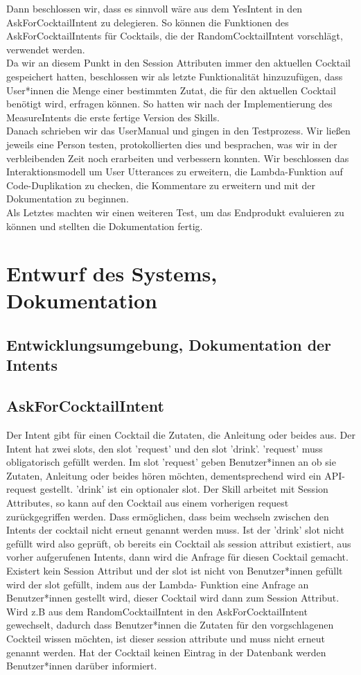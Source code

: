 \documentclass[12pt,letterpaper]{article}
\begin{document}
Dann beschlossen wir, dass es sinnvoll wäre aus dem YesIntent in den AskForCocktailIntent zu delegieren. So können die Funktionen des AskForCocktailIntents für Cocktails, die der RandomCocktailIntent vorschlägt, verwendet werden. \\ 
Da wir an diesem Punkt in den Session Attributen immer den aktuellen Cocktail gespeichert hatten, beschlossen wir als letzte Funktionalität hinzuzufügen, dass User*innen die Menge einer bestimmten Zutat, die für den aktuellen Cocktail benötigt wird, erfragen können. So hatten wir nach der Implementierung des MeasureIntents die erste fertige Version des Skills. \\
Danach schrieben wir das UserManual und gingen in den Testprozess. Wir ließen jeweils eine Person testen, protokollierten dies und besprachen, was wir in der verbleibenden Zeit noch erarbeiten und verbessern konnten. Wir beschlossen das Interaktionsmodell um User Utterances zu erweitern, die Lambda-Funktion auf Code-Duplikation zu checken, die Kommentare zu erweitern und mit der Dokumentation zu beginnen. \\
Als Letztes machten wir einen weiteren Test, um das Endprodukt evaluieren zu können und stellten die Dokumentation fertig.

\section{Entwurf des Systems, Dokumentation}
\subsection{Entwicklungsumgebung, Dokumentation der Intents}

\subsection{AskForCocktailIntent}
Der Intent gibt für einen Cocktail die Zutaten, die Anleitung oder beides aus.
Der Intent hat zwei slots, den slot 'request' und den slot 'drink'. 'request' muss obligatorisch gefüllt werden. Im slot 'request' geben Benutzer*innen an ob sie Zutaten, Anleitung oder beides hören möchten, dementsprechend wird ein API-request gestellt. 'drink' ist ein optionaler slot. Der Skill arbeitet mit Session Attributes, so kann auf den Cocktail aus einem vorherigen request zurückgegriffen werden. Dass ermöglichen, dass beim wechseln zwischen den Intents der cocktail nicht erneut genannt werden muss. Ist der 'drink' slot nicht gefüllt wird also geprüft, ob bereits ein Cocktail als session attribut existiert, aus vorher aufgerufenen Intents, dann wird die Anfrage für diesen Cocktail gemacht. Existert kein Session Attribut und der slot ist nicht von Benutzer*innen gefüllt wird der slot gefüllt, indem aus der Lambda- Funktion eine Anfrage an Benutzer*innen gestellt wird, dieser Cocktail wird dann zum Session Attribut. Wird z.B aus dem RandomCocktailIntent in den AskForCocktailIntent gewechselt, dadurch dass Benutzer*innen die Zutaten für den vorgschlagenen Cockteil wissen möchten, ist dieser session attribute und muss nicht erneut genannt werden.
Hat der Cocktail keinen Eintrag in der Datenbank werden Benutzer*innen darüber informiert.
\end{document}
